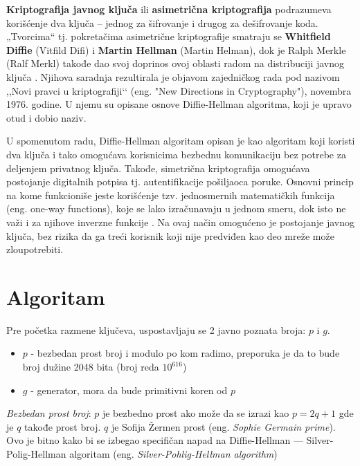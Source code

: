 \documentclass[a4paper]{article}
\begin{document}
\textbf{Kriptografija javnog ključa} ili \textbf{asimetrična kriptografija} podrazumeva korišćenje dva ključa – jednog za šifrovanje i drugog za dešifrovanje koda. „Tvorcima“ tj. pokretačima asimetrične kriptografije smatraju se \textbf{Whitfield Diffie} (Vitfild Difi) i \textbf{Martin Hellman} (Martin Helman), dok je Ralph Merkle (Ralf Merkl) takođe dao svoj doprinos ovoj oblasti radom na distribuciji javnog ključa \cite{Diffie-Hellman}. Njihova saradnja rezultirala je objavom zajedničkog rada pod nazivom ,,Novi pravci u kriptografiji‘‘ (eng. "New Directions in Cryptography"), novembra 1976. godine. U njemu su opisane osnove Diffie-Hellman algoritma, koji je upravo otud i dobio naziv. %

U spomenutom radu, Diffie-Hellman algoritam opisan je kao algoritam koji koristi dva ključa i tako omogućava korisnicima bezbednu komunikaciju bez potrebe za deljenjem privatnog ključa. Takođe, simetrična kriptografija omogućava postojanje digitalnih potpisa tj. autentifikacije pošiljaoca poruke. Osnovni princip na kome funkcioniše jeste korišćenje tzv. jednosmernih matematičkih funkcija (eng. one-way functions), koje se lako izračunavaju u jednom smeru, dok isto ne važi i za njihove inverzne funkcije \cite{cryptography}. Na ovaj način omogućeno je postojanje javnog ključa, bez rizika da ga treći korisnik koji nije predviđen kao deo mreže može zloupotrebiti. 



\section{Algoritam}
\label{sec:algoritam}

Pre početka razmene ključeva, uspostavljaju se 2 javno poznata broja: $p$ i $g$.
\begin{itemize}

    \item $p$ - bezbedan prost broj i modulo po kom radimo, preporuka je da to bude broj dužine 2048 bita (broj reda $10^{616}$) \cite{logjam}
    \item $g$ - generator, mora da bude primitivni koren od $p$

\end{itemize}

\emph{Bezbedan prost broj}: $p$ je bezbedno prost ako može da se izrazi kao $p = 2q + 1$ gde je $q$ takođe prost broj. 
$q$ je Sofija Žermen prost (eng. \emph{Sophie Germain prime}). 
Ovo je bitno kako bi se izbegao specifičan napad na Diffie-Hellman --- 
Silver-Polig-Hellman algoritam (eng. \emph{Silver-Pohlig-Hellman algorithm}) \cite{pohlig-hellman}
\end{document}
